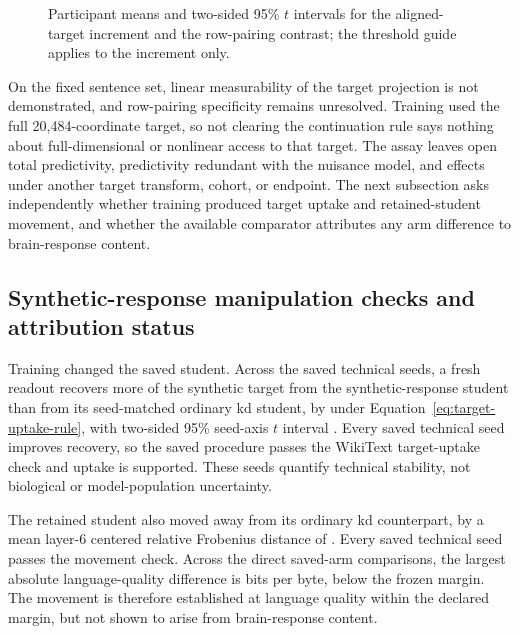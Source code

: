 \begin{figure}[tbp]
  \centering
  \resizebox{\linewidth}{!}{}
  \caption{Participant means and two-sided 95\% \(t\) intervals for the aligned-target increment and the row-pairing contrast; the threshold guide applies to the increment only.}
  \label{fig:exact-target-measurability}
\end{figure}

 On the fixed sentence set, linear measurability of the target projection is not demonstrated, and row-pairing specificity remains unresolved.
Training used the full 20,484-coordinate target, so not clearing the continuation rule says nothing about full-dimensional or nonlinear access to that target.
The assay leaves open total predictivity, predictivity redundant with the nuisance model, and effects under another target transform, cohort, or endpoint.
The next subsection asks independently whether training produced target uptake and retained-student movement, and whether the available comparator attributes any arm difference to brain-response content.

\subsection{Synthetic-response manipulation checks and attribution status}
\label{sec:results-synthetic-manipulation}

Training changed the saved student.
Across the  saved technical seeds, a fresh readout recovers more of the synthetic target from the synthetic-response student than from its seed-matched ordinary \ac{kd} student, by  under Equation~\ref{eq:target-uptake-rule}, with two-sided 95\% seed-axis \(t\) interval .
Every saved technical seed improves recovery, so the saved procedure passes the WikiText target-uptake check and uptake is supported.
These seeds quantify technical stability, not biological or model-population uncertainty. 

The retained student also moved away from its ordinary \ac{kd} counterpart, by a mean layer-6 centered relative Frobenius distance of .
Every saved technical seed passes the movement check.
Across the direct saved-arm comparisons, the largest absolute language-quality difference is  bits per byte, below the frozen  margin.
The movement is therefore established at language quality within the declared margin, but not shown to arise from brain-response content. 

